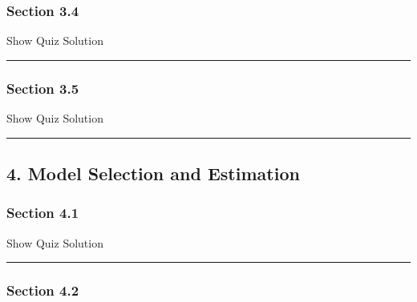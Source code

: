 \documentclass[]{article}
\begin{document}
\subsubsection{Section 3.4}\label{section-3.4}

\hypertarget{surveyElement34}{}

\hypertarget{surveyResult34}{}

Show Quiz Solution

\hypertarget{display.Quiz34.2}{}
\begin{center}\rule{0.5\linewidth}{\linethickness}\end{center}

\subsubsection{Section 3.5}\label{section-3.5}

\hypertarget{surveyElement35}{}

\hypertarget{surveyResult35}{}

Show Quiz Solution

\hypertarget{display.Quiz35.2}{}
\begin{center}\rule{0.5\linewidth}{\linethickness}\end{center}

\subsection{4. Model Selection and
Estimation}\label{model-selection-and-estimation}

\subsubsection{Section 4.1}\label{section-4.1}

\hypertarget{surveyElement41}{}

\hypertarget{surveyResult41}{}

Show Quiz Solution

\hypertarget{display.Quiz41.2}{}
\begin{center}\rule{0.5\linewidth}{\linethickness}\end{center}

\subsubsection{Section 4.2}\label{section-4.2}

\hypertarget{surveyElement42}{}
\end{document}
